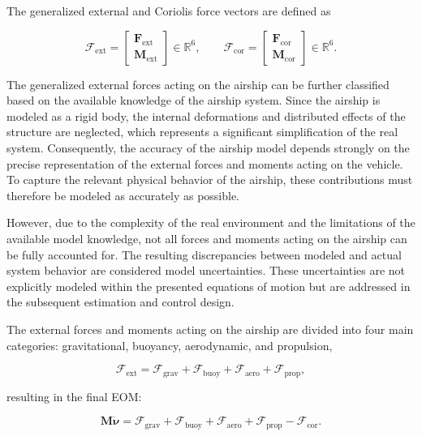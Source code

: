 The generalized external and Coriolis force vectors are defined as

\begin{equation}
	\bm{\mathcal{F}}_\mathrm{ext}
	=
	\begin{bmatrix}
		\bm{F}_\mathrm{ext}\\ \bm{M}_\mathrm{ext}
	\end{bmatrix} \in\mathbb{R}^{6},
	\qquad
	\bm{\mathcal{F}}_\mathrm{cor}
	=
	\begin{bmatrix}
		\bm{F}_\mathrm{cor}\\ \bm{M}_\mathrm{cor}
	\end{bmatrix} \in \mathbb{R}^{6}.
	\label{eq:ExternalForces}
\end{equation}

The generalized external forces acting on the airship can be further classified based on the available knowledge of the airship system. Since the airship is modeled as a rigid body, the internal deformations and distributed effects of the structure are neglected, which represents a significant simplification of the real system. Consequently, the accuracy of the airship model depends strongly on the precise representation of the external forces and moments acting on the vehicle. To capture the relevant physical behavior of the airship, these contributions must therefore be modeled as accurately as possible.

However, due to the complexity of the real environment and the limitations of the available model knowledge, not all forces and moments acting on the airship can be fully accounted for. The resulting discrepancies between modeled and actual system behavior are considered model uncertainties. 
These uncertainties are not explicitly modeled within the presented equations of motion but are addressed in the subsequent estimation and control design.

The external forces and moments acting on the airship are divided into four main categories: gravitational, buoyancy, aerodynamic, and propulsion,

\begin{equation}
	\bm{\mathcal{F}}_\mathrm{ext} = \bm{\mathcal{F}}_\mathrm{grav} + \bm{\mathcal{F}}_\mathrm{buoy} + \bm{\mathcal{F}}_\mathrm{aero} + \bm{\mathcal{F}}_\mathrm{prop},
\end{equation}

resulting in the final EOM:

\begin{equation}
	\bm{M}\dot{\bm{\nu}}
	=
	\bm{\mathcal{F}}_\mathrm{grav} + \bm{\mathcal{F}}_\mathrm{buoy} + \bm{\mathcal{F}}_\mathrm{aero} + \bm{\mathcal{F}}_\mathrm{prop}
	- \bm{\mathcal{F}}_\mathrm{cor}.
	\label{eq:EOM}
\end{equation}

